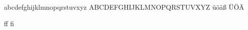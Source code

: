 \documentclass{article}
\begin{document}
abcdefghijklmnopqrstuvxyz ABCDEFGHIJKLMNOPQRSTUVXYZ üöäß ÜÖÄ

ff fi
\end{document}
